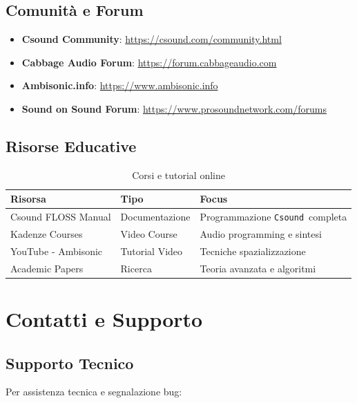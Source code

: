 \documentclass[a4paper,11pt,openany]{book}
\newcommand{\csound}{\texttt{Csound}}
\begin{document}
\subsection{Comunità e Forum}

\begin{itemize}
    \item \textbf{Csound Community}: \url{https://csound.com/community.html}
    \item \textbf{Cabbage Audio Forum}: \url{https://forum.cabbageaudio.com}
    \item \textbf{Ambisonic.info}: \url{https://www.ambisonic.info}
    \item \textbf{Sound on Sound Forum}: \url{https://www.prosoundnetwork.com/forums}
\end{itemize}

\subsection{Risorse Educative}

\begin{table}[H]
    \centering
    \caption{Corsi e tutorial online}
    \label{tab:educational_resources}
    \begin{tabular}{@{}p{4cm}p{3cm}p{6cm}@{}}
        \toprule
        \textbf{Risorsa} & \textbf{Tipo} & \textbf{Focus} \\
        \midrule
        Csound FLOSS Manual & Documentazione & Programmazione \csound\ completa \\
        Kadenze Courses & Video Course & Audio programming e sintesi \\
        YouTube - Ambisonic & Tutorial Video & Tecniche spazializzazione \\
        Academic Papers & Ricerca & Teoria avanzata e algoritmi \\
        \bottomrule
    \end{tabular}
\end{table}

\section{Contatti e Supporto}

\subsection{Supporto Tecnico}

Per assistenza tecnica e segnalazione bug:
\end{document}
